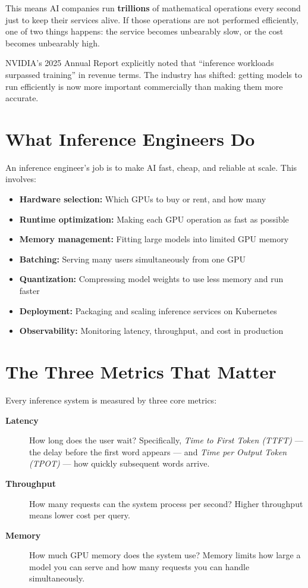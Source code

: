 \documentclass[11pt, twoside, openright]{book}
\newcommand{\notebox}[2]{\begin{tcolorbox}[notestyle, title={#1}]#2\end{tcolorbox}}
\newcommand{\keyterm}[1]{\textbf{\color{AccentOrange}#1}}
\begin{document}
\noindent This means AI companies run \textbf{trillions} of mathematical operations
every second just to keep their services alive.  If those operations are not
performed efficiently, one of two things happens: the service becomes unbearably slow,
or the cost becomes unbearably high.

\notebox{Key Insight}{
NVIDIA's 2025 Annual Report explicitly noted that ``inference workloads surpassed
training'' in revenue terms.  The industry has shifted: getting models to run
efficiently is now more important commercially than making them more accurate.
}

\section{What Inference Engineers Do}

An inference engineer's job is to make AI fast, cheap, and reliable at scale.
This involves:

\begin{itemize}
  \item \textbf{Hardware selection:} Which GPUs to buy or rent, and how many
  \item \textbf{Runtime optimization:} Making each GPU operation as fast as possible
  \item \textbf{Memory management:} Fitting large models into limited GPU memory
  \item \textbf{Batching:} Serving many users simultaneously from one GPU
  \item \textbf{Quantization:} Compressing model weights to use less memory and run faster
  \item \textbf{Deployment:} Packaging and scaling inference services on Kubernetes
  \item \textbf{Observability:} Monitoring latency, throughput, and cost in production
\end{itemize}

\section{The Three Metrics That Matter}

Every inference system is measured by three core metrics:

\begin{description}
  \item[\keyterm{Latency}] How long does the user wait?  Specifically,
    \textit{Time to First Token (TTFT)} --- the delay before the
    first word appears --- and \textit{Time per Output Token (TPOT)}
    --- how quickly subsequent words arrive.
  \item[\keyterm{Throughput}] How many requests can the system process per second?
    Higher throughput means lower cost per query.
  \item[\keyterm{Memory}] How much GPU memory does the system use?  Memory limits
    how large a model you can serve and how many requests you can handle
    simultaneously.
\end{description}
\end{document}

